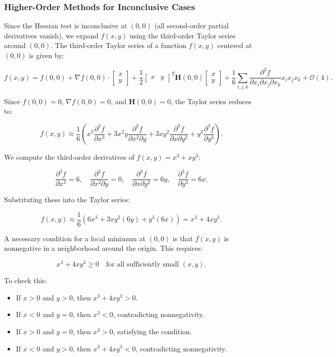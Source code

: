 \documentclass[12pt]{article}
\begin{document}
\subsubsection{Higher-Order Methods for Inconclusive Cases}

Since the Hessian test is inconclusive at \( (0,0) \) (all second-order partial derivatives vanish), we expand \( f(x,y) \) using the third-order Taylor series around \( (0,0) \). The third-order Taylor series of a function \( f(x,y) \) centered at \( (0,0) \) is given by:

\[
f(x, y) = f(0,0) + \nabla f(0,0) \cdot \begin{bmatrix} x \\ y \end{bmatrix} 
+ \frac{1}{2} \begin{bmatrix} x & y \end{bmatrix}^T \mathbf{H}(0,0) \begin{bmatrix} x \\ y \end{bmatrix}
+ \frac{1}{6} \sum_{i,j,k} \frac{\partial^3 f}{\partial x_i \partial x_j \partial x_k} x_i x_j x_k + \mathcal{O}(4).
\]

Since \( f(0,0) = 0 \), \( \nabla f(0,0) = 0 \), and \( \mathbf{H}(0,0) = 0 \), the Taylor series reduces to:

\[
f(x, y) \approx \frac{1}{6} \left( x^3 \frac{\partial^3 f}{\partial x^3} + 3x^2y \frac{\partial^3 f}{\partial x^2 \partial y} 
+ 3xy^2 \frac{\partial^3 f}{\partial x \partial y^2} + y^3 \frac{\partial^3 f}{\partial y^3} \right).
\]

We compute the third-order derivatives of \( f(x, y) = x^3 + xy^3 \):

\[
\frac{\partial^3 f}{\partial x^3} = 6, \quad
\frac{\partial^3 f}{\partial x^2 \partial y} = 0, \quad
\frac{\partial^3 f}{\partial x \partial y^2} = 6y, \quad
\frac{\partial^3 f}{\partial y^3} = 6x.
\]

Substituting these into the Taylor series:

\[
f(x, y) \approx \frac{1}{6} \left( 6x^3 + 3xy^2(6y) + y^3(6x) \right)
 =  x^3 + 4xy^3.
\]

A necessary condition for a local minimum at \( (0,0) \) is that \( f(x, y) \) is nonnegative in a neighborhood around the origin. This requires:

\[
x^3 + 4xy^3 \geq 0 \quad \text{for all sufficiently small } (x,y).
\]

To check this:
\begin{itemize}
\item If \( x > 0 \) and \( y > 0 \), then \( x^3 + 4xy^3 > 0 \).
\item If \( x < 0 \) and \( y = 0 \), then \( x^3 < 0 \), contradicting nonnegativity.
\item If \( x > 0 \) and \( y = 0 \), then \( x^3 > 0 \), satisfying the condition.
\item If \( x < 0 \) and \( y > 0 \), then \( x^3 + 4xy^3 < 0\), contradicting nonnegativity.

\end{itemize}
\end{document}
